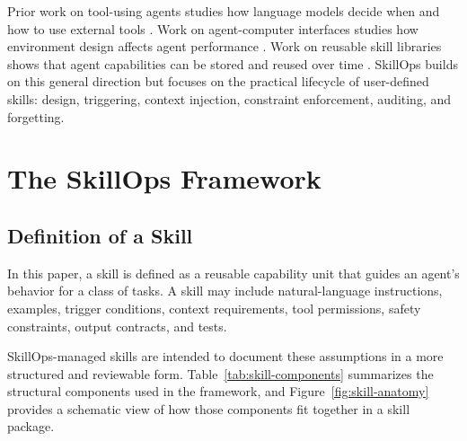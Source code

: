 \documentclass[11pt]{article}
\begin{document}
Prior work on tool-using agents studies how language models decide when and how
to use external tools \citep{schick2023toolformer,yao2023react}. Work on
agent-computer interfaces studies how environment design affects agent
performance \citep{yang2024sweagent}. Work on reusable skill libraries shows
that agent capabilities can be stored and reused over time
\citep{wang2024voyager}. SkillOps builds on this general direction but focuses
on the practical lifecycle of user-defined skills: design, triggering, context
injection, constraint enforcement, auditing, and forgetting.

\section{The SkillOps Framework}

\subsection{Definition of a Skill}

In this paper, a skill is defined as a reusable capability unit that guides an
agent's behavior for a class of tasks. A skill may include natural-language
instructions, examples, trigger conditions, context requirements, tool
permissions, safety constraints, output contracts, and tests.

SkillOps-managed skills are intended to document these assumptions in a more
structured and reviewable form. Table~\ref{tab:skill-components} summarizes the
structural components used in the framework, and Figure~\ref{fig:skill-anatomy}
provides a schematic view of how those components fit together in a skill
package.
\end{document}
